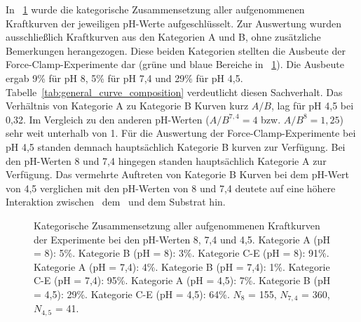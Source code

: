 In \abb~\ref{fig:general_curve_composition} wurde die kategorische Zusammensetzung aller aufgenommenen Kraftkurven der jeweiligen pH-Werte aufgeschlüsselt. Zur Auswertung wurden ausschließlich Kraftkurven aus den Kategorien A und B, ohne zusätzliche Bemerkungen herangezogen. Diese beiden Kategorien stellten die Ausbeute der Force-Clamp-Experimente dar (grüne und blaue Bereiche in \abb~\ref{fig:general_curve_composition}). Die Ausbeute ergab 9\% für pH 8, 5\% für pH 7,4 und 29\% für pH 4,5. Tabelle~\ref{tab:general_curve_composition} verdeutlicht diesen Sachverhalt. Das Verhältnis von Kategorie A zu Kategorie B Kurven kurz $A/B$, lag für pH 4,5 bei 0,32. Im Vergleich zu den anderen pH-Werten ($A/B^{7,4} = 4$ bzw. $A/B^{8} = 1,25$) sehr weit unterhalb von 1. Für die Auswertung der Force-Clamp-Experimente bei pH 4,5 standen demnach hauptsächlich Kategorie B kurven zur Verfügung. Bei den pH-Werten 8 und 7,4 hingegen standen hauptsächlich Kategorie A zur Verfügung. Das vermehrte Auftreten von Kategorie B Kurven bei dem pH-Wert von 4,5 verglichen mit den pH-Werten von 8 und 7,4 deutete auf eine höhere Interaktion zwischen \spitze~dem \spacer~und dem Substrat hin.

\begin{figure}[H]
	\centering
	\caption[Kategorische Zusammensetzung aller aufgenommenen Kraftkurven]{Kategorische Zusammensetzung aller aufgenommenen Kraftkurven der Experimente bei den pH-Werten 8, 7,4 und 4,5. Kategorie A (pH = 8): 5\%. Kategorie B (pH = 8): 3\%. Kategorie C-E (pH = 8): 91\%. Kategorie A (pH = 7,4): 4\%. Kategorie B (pH = 7,4): 1\%. Kategorie C-E (pH = 7,4): 95\%. Kategorie A (pH = 4,5): 7\%. Kategorie B (pH = 4,5): 29\%. Kategorie C-E (pH = 4,5): 64\%. $N_8$ = 155, $N_{7,4}$ = 360, $N_{4,5}$ = 41.}
	\label{fig:general_curve_composition}
\end{figure}

